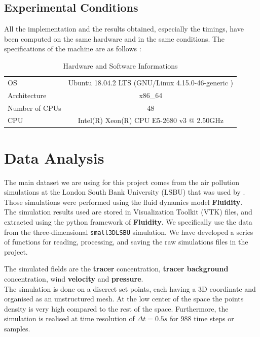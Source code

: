 \subsection{Experimental Conditions}

All the implementation and the results obtained, especially the timings, have been computed on the same hardware and in the same conditions. The specifications of the machine are as follows :

\begin{table}[h!]
\centering
\begin{tabular}{l|c}
\toprule

OS & Ubuntu 18.04.2 LTS (GNU/Linux 4.15.0-46-generic ) \\ 
Architecture    &    x86\_64 \\ 

Number of CPUs          &    48\\ 

CPU     &    Intel(R) Xeon(R) CPU E5-2680 v3 @ 2.50GHz \\ \bottomrule

\end{tabular}
\caption{Hardware and Software Informations}
\end{table}



\section{Data Analysis}
The main dataset we are using for this project comes from the air pollution simulations at the London South Bank University (LSBU) that was used by \citet{arcucci_optimal_2019}. Those simulations were performed using the fluid dynamics model \textbf{Fluidity}. \\ 


The simulation results used are stored in Visualization Toolkit (VTK) files, and extracted using the python framework of \textbf{Fluidity}. We specifically use the data from the three-dimensional \texttt{small3DLSBU} simulation. We have developed a series of functions for reading, processing, and saving the raw simulations files in the project. 

The simulated fields are the \textbf{tracer} concentration, \textbf{tracer background} concentration, wind \textbf{velocity} and \textbf{pressure}. \\


The simulation is done on a discreet set points, each having a 3D coordinate and organised as an unstructured mesh. At the low center of the space the points density is very high compared to the rest of the space. Furthermore, the simulation is realised at time resolution of $\Delta t = 0.5s$ for $988$ time steps or samples. \\
 

